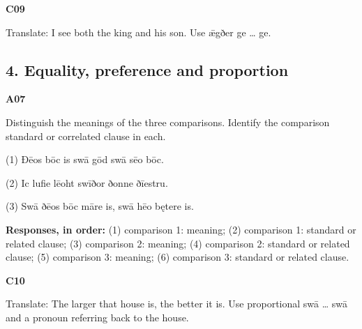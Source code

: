 \par\begin{minipage}{\linewidth}\raggedright
\textbf{C09}

Translate: I see both the king and his son. Use ǣgðer ge … ge.

\end{minipage}\par\addvspace{4pt}

\subsection*{4. Equality, preference and proportion}

\par\begin{minipage}{\linewidth}\raggedright
\textbf{A07}

Distinguish the meanings of the three comparisons. Identify the comparison standard or correlated clause in each.

(1) Ðēos bōc is swā gōd swā sēo bōc.

(2) Ic lufie lēoht swīðor ðonne ðīestru.

(3) Swā ðēos bōc māre is, swā hēo bętere is.

\textbf{Responses, in order:} (1) comparison 1: meaning; (2) comparison 1: standard or related clause; (3) comparison 2: meaning; (4) comparison 2: standard or related clause; (5) comparison 3: meaning; (6) comparison 3: standard or related clause.

\end{minipage}\par\addvspace{4pt}

\par\begin{minipage}{\linewidth}\raggedright
\textbf{C10}

Translate: The larger that house is, the better it is. Use proportional swā … swā and a pronoun referring back to the house.

\end{minipage}\par\addvspace{4pt}

